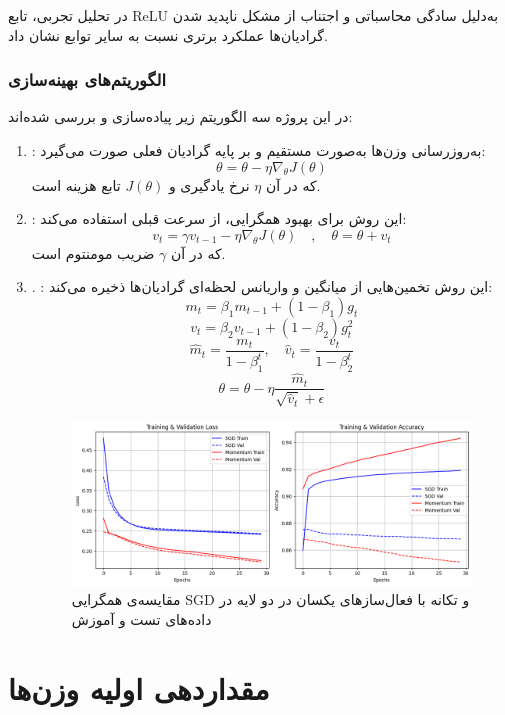 	
	در تحلیل تجربی، تابع ReLU به‌دلیل سادگی محاسباتی و اجتناب از مشکل ناپدید شدن گرادیان‌ها عملکرد برتری نسبت به سایر توابع نشان داد.
	
	\subsubsection{الگوریتم‌های بهینه‌سازی}
	
	در این پروژه سه الگوریتم زیر پیاده‌سازی و بررسی شده‌اند:
	\begin{enumerate}
		\item {}:
		به‌روزرسانی وزن‌ها به‌صورت مستقیم و بر پایه گرادیان فعلی صورت می‌گیرد:
		\[
		\theta = \theta - \eta \nabla_\theta J(\theta)
		\]
		که در آن \(\eta\) نرخ یادگیری و \(J(\theta)\) تابع هزینه است.
		
		\item {}:
		این روش برای بهبود همگرایی، از سرعت قبلی استفاده می‌کند:
		\[
		v_t = \gamma v_{t-1} - \eta \nabla_\theta J(\theta) \quad,\quad \theta = \theta + v_t
		\]
		که در آن \(\gamma\) ضریب مومنتوم است.
		\item. :
		این روش تخمین‌هایی از میانگین و واریانس لحظه‌ای گرادیان‌ها ذخیره می‌کند:
		\[
		m_t = \beta_1 m_{t-1} + (1 - \beta_1) g_t
		\]
		\[
		v_t = \beta_2 v_{t-1} + (1 - \beta_2) g_t^2
		\]
		\[
		\hat{m}_t = \frac{m_t}{1 - \beta_1^t}, \quad \hat{v}_t = \frac{v_t}{1 - \beta_2^t}
		\]
		\[
		\theta = \theta - \eta \frac{\hat{m}_t}{\sqrt{\hat{v}_t} + \epsilon}
		\]
		\begin{figure}[h]
			\centering
			\includegraphics[width=0.7\linewidth]{images/task4-3}
			\caption{مقایسه‌ی همگرایی SGD و تکانه با فعال‌سازهای یکسان در دو لایه در داده‌های تست و آموزش}
			\label{fig:task4-3}
		\end{figure}
		
	
	\end{enumerate}
	

	
	
	
	\section*{مقداردهی اولیه وزن‌ها}
	
